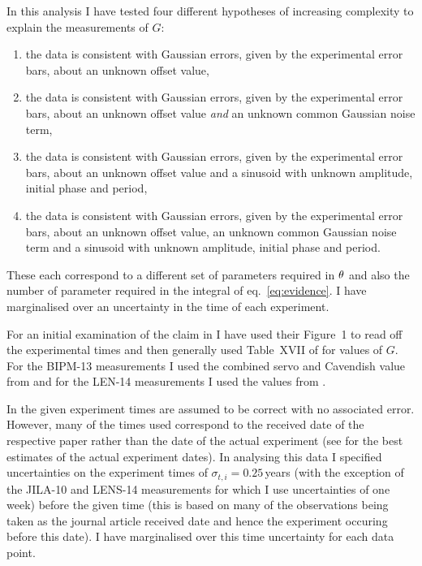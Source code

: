 \documentclass[comment]{epl2}
\begin{document}
In this analysis I have tested four different hypotheses of increasing complexity to explain the measurements of $G$:
\begin{enumerate}
 \item the data is consistent with Gaussian errors, given by the experimental error bars, about an unknown
 offset value,
 \item the data is consistent with Gaussian errors, given by the experimental error bars, about an unknown
 offset value {\it and} an unknown common Gaussian noise term,
 \item the data is consistent with Gaussian errors, given by the experimental error bars, about an unknown
 offset value and a sinusoid with unknown amplitude, initial phase and period,
 \item the data is consistent with Gaussian errors, given by the experimental error bars, about an unknown
 offset value, an unknown common Gaussian noise term and a sinusoid with unknown amplitude, initial phase and period.
\end{enumerate}
These each correspond to a different set of parameters required in $\mathbf{\theta}$ and also the number of
parameter required in the integral of eq.~\ref{eq:evidence}. I have marginalised over an uncertainty in the time
of each experiment.

For an initial examination of the claim in \cite{2015EL....11010002A} I have used their Figure~1 to read off
the experimental times and then generally used Table~XVII of \cite{RevModPhys.84.1527} for values of $G$.
For the BIPM-13 measurements I used the combined servo and Cavendish value from \cite{PhysRevLett.113.039901}
and for the LEN-14 measurements I used the values from \cite{2014Natur.510..518R}.

In \cite{2015EL....11010002A} the given experiment times are assumed to be correct with no associated error.
However, many of the times used correspond to the received date of the respective paper rather than the
date of the actual experiment (see \cite{2015arXiv150501774S} for the best estimates of the actual experiment
dates).  In analysing this data I specified uncertainties on the experiment times of
$\sigma_{t,i} = 0.25$\,years (with the exception of the JILA-10 and LENS-14 measurements for which I use uncertainties
of one week) before the given time (this is based on many of the observations being taken as the journal article
received date and hence the experiment occuring before this date). I have marginalised over this time uncertainty
for each data point.  
\end{document}
